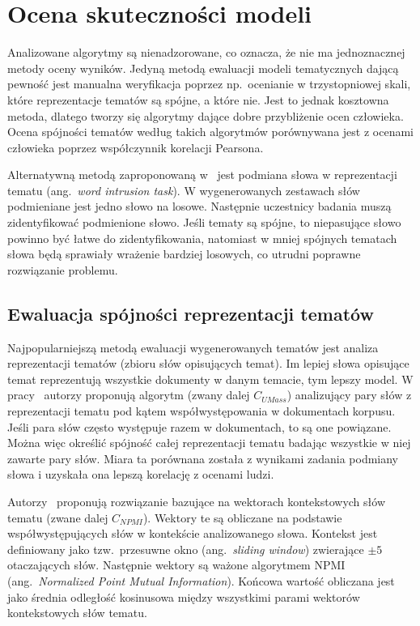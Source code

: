 
\chapter{Ocena skuteczności modeli}
	Analizowane algorytmy są nienadzorowane, co oznacza, że nie ma jednoznacznej metody oceny wyników.
	Jedyną metodą ewaluacji modeli tematycznych dającą pewność jest manualna weryfikacja poprzez np.\ ocenianie w trzystopniowej skali,
		które reprezentacje tematów są spójne, a które nie.
	Jest to jednak kosztowna metoda, dlatego tworzy się algorytmy dające dobre przybliżenie ocen człowieka.
	Ocena spójności tematów według takich algorytmów porównywana jest z ocenami człowieka poprzez współczynnik korelacji Pearsona.

	Alternatywną metodą zaproponowaną w~\cite{Word_intrusion} jest podmiana słowa w reprezentacji tematu (ang.\ \emph{word intrusion task}).
	W wygenerowanych zestawach słów podmieniane jest jedno słowo na losowe.
	Następnie uczestnicy badania muszą zidentyfikować podmienione słowo.
	Jeśli tematy są spójne, to niepasujące słowo powinno być łatwe do zidentyfikowania,
		natomiast w mniej spójnych tematach słowa będą sprawiały wrażenie bardziej losowych, co utrudni poprawne rozwiązanie problemu.

\section{Ewaluacja spójności reprezentacji tematów}
	Najpopularniejszą metodą ewaluacji wygenerowanych tematów jest analiza reprezentacji tematów (zbioru słów opisujących temat).
	Im lepiej słowa opisujące temat reprezentują wszystkie dokumenty w danym temacie, tym lepszy model.
	W pracy~\cite{U_MASS} autorzy proponują algorytm (zwany dalej \(C_{UMass}\))
		analizujący pary słów z reprezentacji tematu pod kątem współwystępowania w dokumentach korpusu.
	Jeśli para słów często występuje razem w dokumentach, to są one powiązane.
	Można więc określić spójność całej reprezentacji tematu badając wszystkie w niej zawarte pary słów.
	Miara ta porównana została z wynikami zadania podmiany słowa i uzyskała ona lepszą korelację z ocenami ludzi.

	Autorzy~\cite{C_NPMI} proponują rozwiązanie bazujące na wektorach kontekstowych słów tematu (zwane dalej \(C_{NPMI}\)).
	Wektory te są obliczane na podstawie współwystępujących słów w kontekście analizowanego słowa.
	Kontekst jest definiowany jako tzw.\ przesuwne okno (ang.\ \emph{sliding window}) zwierające \(\pm 5\) otaczających słów.
	Następnie wektory są ważone algorytmem NPMI (ang.\ \emph{Normalized Point Mutual Information}).
	Końcowa wartość obliczana jest jako średnia odległość kosinusowa między wszystkimi parami wektorów kontekstowych słów tematu.


